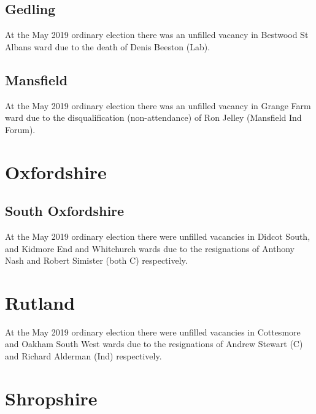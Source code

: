 \documentclass[a4paper,openany]{book}
\begin{document}
\begin{resultsiii}
\subsection*{Gedling}

At the May 2019 ordinary election there was an unfilled vacancy in Bestwood St Albans ward due to the death of Denis Beeston (Lab).

\subsection*{Mansfield}

At the May 2019 ordinary election there was an unfilled vacancy in Grange Farm ward due to the disqualification (non-attendance) of Ron Jelley (Mansfield Ind Forum).

\section{Oxfordshire}

\subsection*{South Oxfordshire}

At the May 2019 ordinary election there were unfilled vacancies in Didcot South, and Kidmore End and Whitchurch wards due to the resignations of Anthony Nash and Robert Simister (both C) respectively.

\section{Rutland}

At the May 2019 ordinary election there were unfilled vacancies in Cottesmore and Oakham South West wards due to the resignations of Andrew Stewart (C) and Richard Alderman (Ind) respectively.

\section{Shropshire}


\end{resultsiii}
\end{document}
